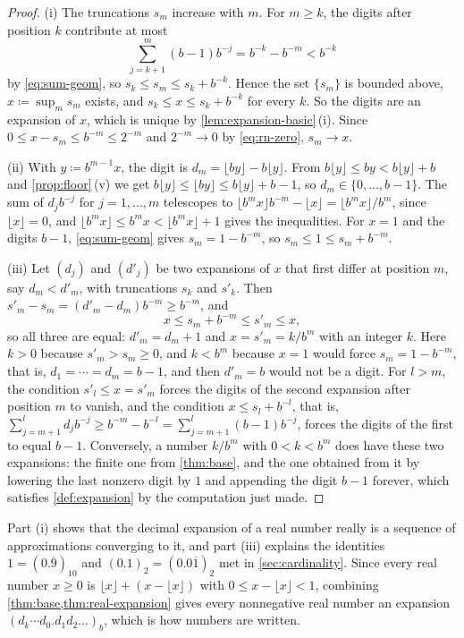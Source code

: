 \begin{proof}
(i) The truncations $s_m$ increase with $m$. For $m\ge k$, the digits after position $k$ contribute at most
\[
\sum_{j=k+1}^m(b-1)b^{-j}=b^{-k}-b^{-m}<b^{-k}
\]
by \eqref{eq:sum-geom}, so $s_k\le s_m\le s_k+b^{-k}$. Hence the set $\{s_m\}$ is bounded above, $x\coloneqq\sup_ms_m$ exists, and $s_k\le x\le s_k+b^{-k}$ for every $k$. So the digits are an expansion of $x$, which is unique by \cref{lem:expansion-basic}\,(i). Since $0\le x-s_m\le b^{-m}\le2^{-m}$ and $2^{-m}\to0$ by \eqref{eq:rn-zero}, $s_m\to x$.

(ii) With $y\coloneqq b^{m-1}x$, the digit is $d_m=\lfloor by\rfloor-b\lfloor y\rfloor$. From $b\lfloor y\rfloor\le by<b\lfloor y\rfloor+b$ and \cref{prop:floor}\,(v) we get $b\lfloor y\rfloor\le\lfloor by\rfloor\le b\lfloor y\rfloor+b-1$, so $d_m\in\{0,\ldots,b-1\}$. The sum of $d_jb^{-j}$ for $j=1,\ldots,m$ telescopes to $\lfloor b^mx\rfloor b^{-m}-\lfloor x\rfloor=\lfloor b^mx\rfloor/b^m$, since $\lfloor x\rfloor=0$, and $\lfloor b^mx\rfloor\le b^mx<\lfloor b^mx\rfloor+1$ gives the inequalities. For $x=1$ and the digits $b-1$, \eqref{eq:sum-geom} gives $s_m=1-b^{-m}$, so $s_m\le1\le s_m+b^{-m}$.

(iii) Let $(d_j)$ and $(d'_j)$ be two expansions of $x$ that first differ at position $m$, say $d_m<d'_m$, with truncations $s_k$ and $s'_k$. Then $s'_m-s_m=(d'_m-d_m)b^{-m}\ge b^{-m}$, and
\[
x\le s_m+b^{-m}\le s'_m\le x ,
\]
so all three are equal: $d'_m=d_m+1$ and $x=s'_m=k/b^m$ with an integer $k$. Here $k>0$ because $s'_m>s_m\ge0$, and $k<b^m$ because $x=1$ would force $s_m=1-b^{-m}$, that is, $d_1=\cdots=d_m=b-1$, and then $d'_m=b$ would not be a digit. For $l>m$, the condition $s'_l\le x=s'_m$ forces the digits of the second expansion after position $m$ to vanish, and the condition $x\le s_l+b^{-l}$, that is, $\sum_{j=m+1}^ld_jb^{-j}\ge b^{-m}-b^{-l}=\sum_{j=m+1}^l(b-1)b^{-j}$, forces the digits of the first to equal $b-1$. Conversely, a number $k/b^m$ with $0<k<b^m$ does have these two expansions: the finite one from \cref{thm:base}, and the one obtained from it by lowering the last nonzero digit by $1$ and appending the digit $b-1$ forever, which satisfies \cref{def:expansion} by the computation just made.
\end{proof}

Part (i) shows that the decimal expansion of a real number really is a sequence of approximations converging to it, and part (iii) explains the identities $1=(0.\overline9)_{10}$ and $(0.1)_2=(0.0\overline1)_2$ met in \cref{sec:cardinality}. Since every real number $x\ge0$ is $\lfloor x\rfloor+(x-\lfloor x\rfloor)$ with $0\le x-\lfloor x\rfloor<1$, combining \cref{thm:base,thm:real-expansion} gives every nonnegative real number an expansion $(d_k\cdots d_0.d_1d_2\ldots)_b$, which is how numbers are written.

